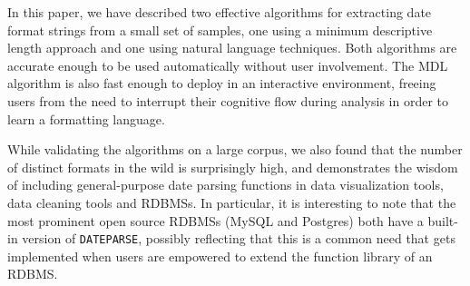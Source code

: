 In this paper, we have described two effective algorithms for extracting date format strings from a small set of samples, one using a minimum descriptive length approach and one using natural language techniques. Both algorithms are accurate enough to be used automatically without user involvement. The MDL algorithm is also fast enough to deploy in an interactive environment, freeing users from the need to interrupt their cognitive flow during analysis in order to learn a formatting language.

While validating the algorithms on a large corpus, we also found that the number of distinct formats in the wild is surprisingly high, and demonstrates the wisdom of including general-purpose date parsing functions in data visualization tools, data cleaning tools and RDBMSs. In particular, it is interesting to note that the most prominent open source RDBMSs (\eg MySQL and Postgres) both have a built-in version of \texttt{DATEPARSE}, possibly reflecting that this is a common need that gets implemented when users are empowered to extend the function library of an RDBMS.